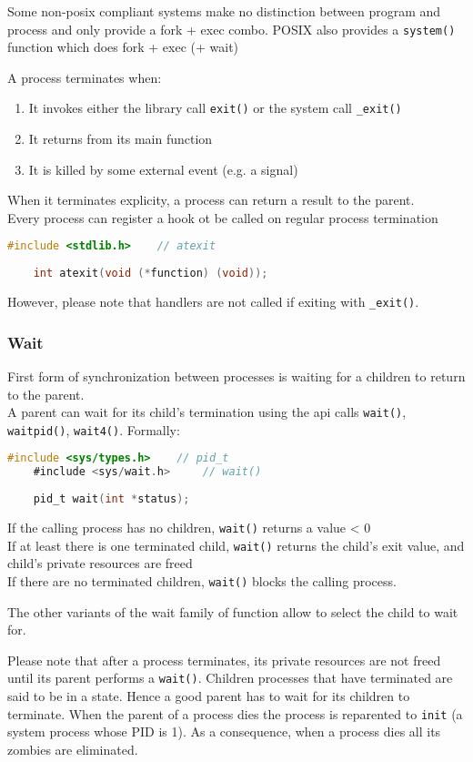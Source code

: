 Some non-posix compliant systems make no distinction between program and process and only provide a fork + exec combo. POSIX also provides a \texttt{system()} function which does fork + exec (+ wait)

A process terminates when:
\begin{enumerate}
    \item It invokes either the library call \texttt{exit()} or the system call \texttt{\_exit()}
    \item It returns from its main function
    \item It is killed by some external event (e.g. a signal)
\end{enumerate}

When it terminates explicity, a process can return a result to the parent.\\
Every process can register a hook ot be called on regular process termination 
\begin{lstlisting}[language=C]
    #include <stdlib.h>    // atexit
    
    int atexit(void (*function) (void));
\end{lstlisting}
However, please note that handlers are not called if exiting with \texttt{\_exit()}.

\subsubsection{Wait}
First form of synchronization between processes is waiting for a children to return to the parent.\\
A parent can wait for its child's termination using the api calls \texttt{wait()}, \texttt{waitpid()}, \texttt{wait4()}.
Formally:
\begin{lstlisting}[language=C]
    #include <sys/types.h>    // pid_t
    #include <sys/wait.h>     // wait()
    
    pid_t wait(int *status);
\end{lstlisting}
If the calling process has no children, \texttt{wait()} returns a value < 0\\
If at least there is one terminated child, \texttt{wait()} returns the child's exit value, and child's private resources are freed\\
If there are no terminated children, \texttt{wait()} blocks the calling process.

The other variants of the wait family of function allow to select the child to wait for.

Please note that after a process terminates, its private resources are not freed until its parent performs a \texttt{wait()}. Children processes that have terminated are said to be in a  state. Hence a good parent has to wait for its children to terminate.
When the parent of a process dies the process is reparented to \texttt{init} (a system process whose PID is 1). As a consequence, when a process dies all its zombies are eliminated.
